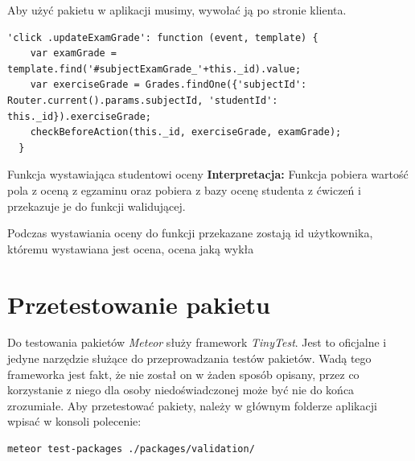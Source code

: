 \documentclass{xmgr}
\begin{document}
Aby użyć pakietu w aplikacji musimy, wywołać ją po stronie klienta.

\begin{listing}[H]
\begin{verbatim}
'click .updateExamGrade': function (event, template) {
    var examGrade = template.find('#subjectExamGrade_'+this._id).value;
    var exerciseGrade = Grades.findOne({'subjectId': Router.current().params.subjectId, 'studentId': this._id}).exerciseGrade;
    checkBeforeAction(this._id, exerciseGrade, examGrade);
  }
\end{verbatim}
\caption{Funkcja wystawiająca studentowi oceny \newline \newline \hspace{\linewidth} \textbf{Interpretacja:} Funkcja pobiera wartość pola z oceną z egzaminu oraz pobiera z bazy ocenę studenta z ćwiczeń i przekazuje je do funkcji walidującej. \newline}
\end{listing}

Podczas wystawiania oceny do funkcji przekazane zostają id użytkownika, któremu wystawiana jest ocena, ocena jaką wykła%

\section{Przetestowanie pakietu}

Do testowania pakietów \textit{Meteor} służy framework \textit{TinyTest}. Jest to oficjalne i jedyne narzędzie służące do przeprowadzania testów pakietów. Wadą tego frameworka jest fakt, że nie został on w żaden sposób opisany, przez co korzystanie z niego dla osoby niedoświadczonej może być nie do końca zrozumiałe.
\newline \newline
Aby przetestować pakiety, należy w głównym folderze aplikacji wpisać w konsoli polecenie:

\begin{lstlisting}[language=bash]
meteor test-packages ./packages/validation/
\end{lstlisting}
\end{document}

